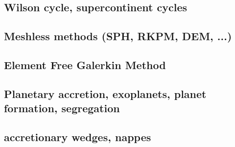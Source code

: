 \subsection*{Wilson cycle, supercontinent cycles}

\noindent
\cite{trry95}
\cite{zhzl07}
\cite{zhzm09}
\cite{begb19}

\subsection*{Meshless methods (SPH, RKPM, DEM, ...)}

\noindent
\cite{lucy77}
\cite{beko96}
\cite{mofz97}
\cite{febh05}
\cite{prcl11}\cite{kukg11}
\cite{koau13}
\cite{nifs15}
\cite{krrk18}

\subsection*{Element Free Galerkin Method}
 

\noindent
\cite{belg95a}
\cite{belg95b}
\cite{bekf96}
\cite{bekk97}
\cite{pobe98}

\subsection*{Planetary accretion, exoplanets, planet formation, segregation}
 

\noindent
\cite{lejm08}
\cite{ligt09}\cite{gogk09}
\cite{ligt11}
\cite{gobg14}\cite{yadl14}
\cite{neum19}

\subsection*{accretionary wedges, nappes} 


